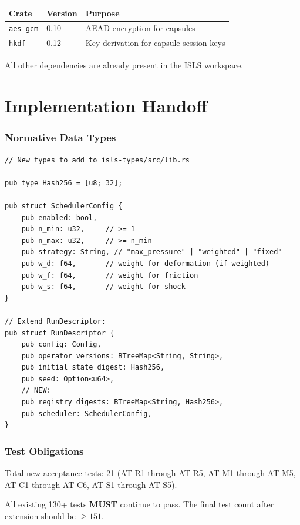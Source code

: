 \documentclass[11pt,a4paper,twoside]{article}
\theoremstyle{definition}
\theoremstyle{plain}
\theoremstyle{remark}
\newcommand{\ISLS}{\textsf{ISLS}}
\begin{document}
\begin{tabular}{l l l}
\toprule
\textbf{Crate} & \textbf{Version} & \textbf{Purpose} \\
\midrule
\texttt{aes-gcm} & 0.10 & AEAD encryption for capsules \\
\texttt{hkdf} & 0.12 & Key derivation for capsule session keys \\
\bottomrule
\end{tabular}

All other dependencies are already present in the \ISLS{} workspace.


\part{Implementation Handoff}\label{part:handoff}

\section{Normative Data Types}\label{sec:handoff:types}

\begin{verbatim}
// New types to add to isls-types/src/lib.rs

pub type Hash256 = [u8; 32];

pub struct SchedulerConfig {
    pub enabled: bool,
    pub n_min: u32,     // >= 1
    pub n_max: u32,     // >= n_min
    pub strategy: String, // "max_pressure" | "weighted" | "fixed"
    pub w_d: f64,       // weight for deformation (if weighted)
    pub w_f: f64,       // weight for friction
    pub w_s: f64,       // weight for shock
}

// Extend RunDescriptor:
pub struct RunDescriptor {
    pub config: Config,
    pub operator_versions: BTreeMap<String, String>,
    pub initial_state_digest: Hash256,
    pub seed: Option<u64>,
    // NEW:
    pub registry_digests: BTreeMap<String, Hash256>,
    pub scheduler: SchedulerConfig,
}
\end{verbatim}

\section{Test Obligations}\label{sec:handoff:tests}

Total new acceptance tests: 21 (AT-R1 through AT-R5, AT-M1 through
AT-M5, AT-C1 through AT-C6, AT-S1 through AT-S5).

All existing 130+ tests \textbf{MUST} continue to pass. The final test
count after extension should be $\ge 151$.
\end{document}
